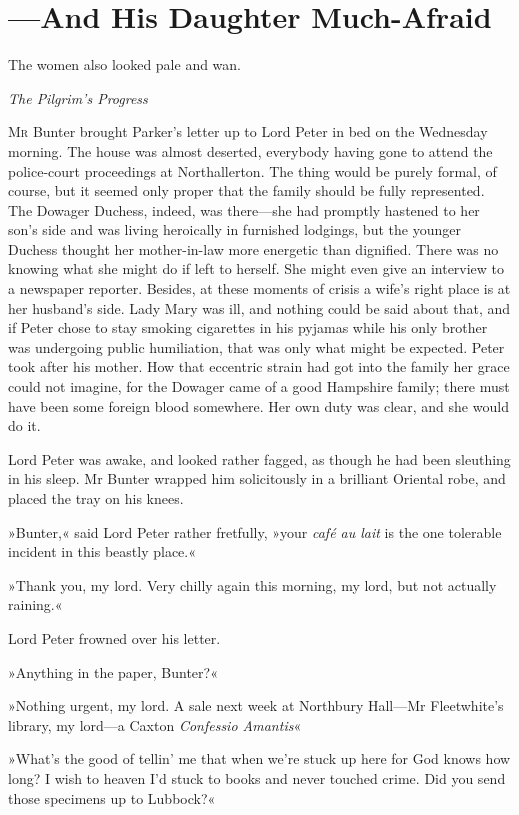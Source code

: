 
\chapter{—And His Daughter Much-Afraid}

\epigraph{The women also looked pale and wan.}{\textit{The Pilgrim's Progress}}


\lettrine[lines=4]{M}{r} Bunter brought Parker's letter up to Lord Peter in bed on the Wednesday morning. The house was almost deserted, everybody having gone to attend the police-court proceedings at Northallerton. The thing would be purely formal, of course, but it seemed only proper that the family should be fully represented. The Dowager Duchess, indeed, was there—she had promptly hastened to her son's side and was living heroically in furnished lodgings, but the younger Duchess thought her mother-in-law more energetic than dignified. There was no knowing what she might do if left to herself. She might even give an interview to a newspaper reporter. Besides, at these moments of crisis a wife's right place is at her husband's side. Lady Mary was ill, and nothing could be said about that, and if Peter chose to stay smoking cigarettes in his pyjamas while his only brother was undergoing public humiliation, that was only what might be expected. Peter took after his mother. How that eccentric strain had got into the family her grace could not imagine, for the Dowager came of a good Hampshire family; there must have been some foreign blood somewhere. Her own duty was clear, and she would do it.

Lord Peter was awake, and looked rather fagged, as though he had been sleuthing in his sleep. Mr Bunter wrapped him solicitously in a brilliant Oriental robe, and placed the tray on his knees.

»Bunter,« said Lord Peter rather fretfully, »your \textit{café au lait} is the one tolerable incident in this beastly place.«

»Thank you, my lord. Very chilly again this morning, my lord, but not actually raining.«

Lord Peter frowned over his letter.

»Anything in the paper, Bunter?«

»Nothing urgent, my lord. A sale next week at Northbury Hall—Mr  Fleetwhite's library, my lord—a Caxton \textit{Confessio Amantis}\longdash«

»What's the good of tellin' me that when we're stuck up here for God knows how long? I wish to heaven I'd stuck to books and never touched crime. Did you send those specimens up to Lubbock?«

